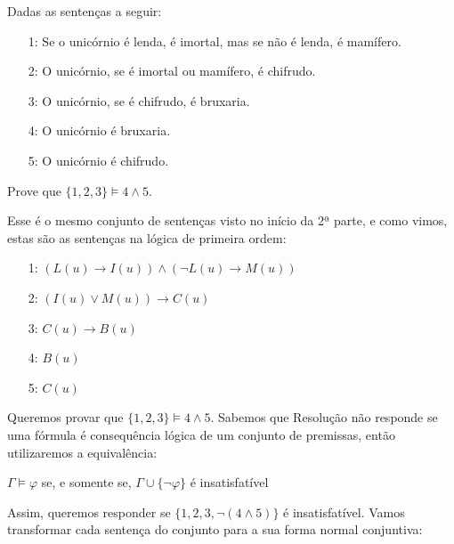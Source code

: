 \begin{rexercises} 

    \begin{question}
        Dadas as sentenças a seguir:
        \begin{enumerate}
            \item[1:] Se o unicórnio é lenda, é imortal, mas se não é lenda, é mamífero.
            \item[2:] O unicórnio, se é imortal ou mamífero, é chifrudo.
            \item[3:] O unicórnio, se é chifrudo, é bruxaria.
            \item[4:] O unicórnio é bruxaria.
            \item[5:] O unicórnio é chifrudo.
        \end{enumerate}
        Prove que $\{1, 2, 3\} \vDash 4 \land 5$.
        \begin{resolution}
            Esse é o mesmo conjunto de sentenças visto no início da 2ª parte, e como vimos, estas são as sentenças na lógica de primeira ordem:
            \begin{enumerate}
                \item[1:] $(L(u) \rightarrow I(u)) \land (\neg L(u) \rightarrow M(u))$ 
                \item[2:] $(I(u) \lor M(u)) \rightarrow C(u)$
                \item[3:] $C(u) \rightarrow B(u)$
                \item[4:] $B(u)$
                \item[5:] $C(u)$
            \end{enumerate} 
        
            Queremos provar que $\{1, 2, 3\} \vDash 4 \land 5$. Sabemos que Resolução não responde se uma fórmula é consequência lógica de um conjunto de premissas, então utilizaremos a equivalência:
            \begin{center}
                $\Gamma \vDash \varphi$ se, e somente se, $\Gamma \cup \{\neg \varphi\}$ é insatisfatível
            \end{center}
            Assim, queremos responder se $\{1, 2, 3, \neg (4 \land 5)\}$ é insatisfatível. Vamos transformar cada sentença do conjunto para a sua forma normal conjuntiva:


\end{resolution}
\end{question}
\end{rexercises}
